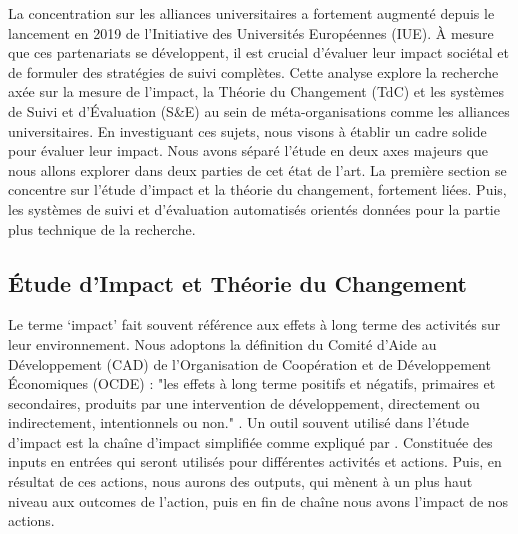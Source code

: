 La concentration sur les alliances universitaires a fortement augmenté depuis le lancement en 2019 de l'Initiative des Universités Européennes (IUE). À mesure que ces partenariats se développent, il est crucial d'évaluer leur impact sociétal et de formuler des stratégies de suivi complètes. Cette analyse explore la recherche axée sur la mesure de l'impact, la Théorie du Changement (TdC) et les systèmes de Suivi et d'Évaluation (S\&E) au sein de méta-organisations comme les alliances universitaires. En investiguant ces sujets, nous visons à établir un cadre solide pour évaluer leur impact.  Nous avons séparé l'étude en deux axes majeurs que nous allons explorer dans deux parties de cet état de l'art. La première section se concentre sur l'étude d'impact et la théorie du changement, fortement liées. Puis, les systèmes de suivi et d'évaluation automatisés orientés données pour la partie plus technique de la recherche.

\subsection{Étude d'Impact et Théorie du Changement}
Le terme ‘impact’ fait souvent référence aux effets à long terme des activités sur leur environnement. Nous adoptons la définition du Comité d'Aide au Développement (CAD) de l’Organisation de Coopération et de Développement Économiques (OCDE) : "les effets à long terme positifs et négatifs, primaires et secondaires, produits par une intervention de développement, directement ou indirectement, intentionnels ou non." \cite{oecd_quality_2010}. Un outil souvent utilisé dans l'étude d'impact est la chaîne d'impact simplifiée comme expliqué par \cite{peersman_when_2016}. Constituée des inputs en entrées qui seront utilisés pour différentes activités et actions. Puis, en résultat de ces actions, nous aurons des outputs, qui mènent à un plus haut niveau aux outcomes de l'action, puis en fin de chaîne nous avons l'impact de nos actions. 

